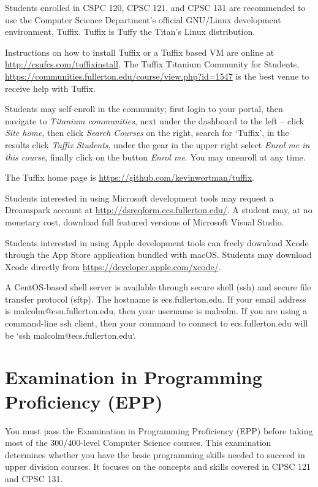 \documentclass{book}
\newcommand{\shrunkurl}[1]{\url{http://csufcs.com/#1}}
\begin{document}
Students enrolled in CSPC 120, CPSC 121, and CPSC 131 are recommended
to use the Computer Science Department’s official GNU/Linux
development environment, Tuffix. Tuffix is Tuffy the Titan’s Linux
distribution.

Instructions on how to install Tuffix or a Tuffix based VM are online
at \shrunkurl{tuffixinstall}. The Tuffix Titanium Community for
Students,
\url{https://communities.fullerton.edu/course/view.php?id=1547} is the
best venue to receive help with Tuffix.

Students may self-enroll in the community; first login to your portal,
then navigate to \emph{Titanium communities}, next under the dashboard
to the left – click \emph{Site home}, then click \emph{Search Courses}
on the right, search for ‘Tuffix’, in the results click \emph{Tuffix
  Students}, under the gear in the upper right select \emph{Enrol me
  in this course}, finally click on the button \emph{Enrol me}. You
may unenroll at any time.

The Tuffix home page is \url{https://github.com/kevinwortman/tuffix}.

Students interested in using Microsoft development tools may request a
Dreamspark account at \url{http://dsreqform.ecs.fullerton.edu/}. A
student may, at no monetary cost, download full featured versions of
Microsoft Visual Studio.

Students interested in using Apple development tools can freely
download Xcode through the App Store application bundled with
macOS. Students may download Xcode directly from
\url{https://developer.apple.com/xcode/}.

A CentOS-based shell server is available through secure shell (ssh)
and secure file transfer protocol (sftp). The hostname is
ecs.fullerton.edu. If your email address is malcolm@csu.fullerton.edu,
then your username is malcolm. If you are using a command-line ssh
client, then your command to connect to ecs.fullerton.edu will be `ssh
malcolm@ecs.fullerton.edu`.



\section{Examination in Programming Proficiency (EPP)}
 You must pass the
Examination in Programming Proficiency (EPP) before taking most of the
300/400-level Computer Science courses. This examination determines
whether you have the basic programming skills needed to succeed in
upper division courses. It focuses on the concepts and skills covered
in CPSC 121 and CPSC 131.
\end{document}
